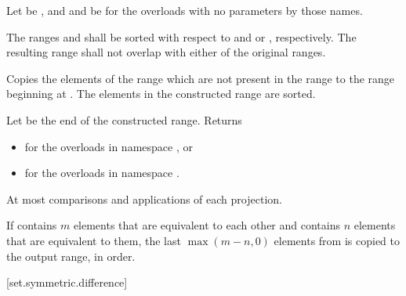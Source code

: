 \begin{itemdescr}
\pnum
Let  be ,
and  and  be 
for the overloads with no parameters by those names.

\pnum
\requires
The ranges  and  shall be sorted
with respect to  and  or , respectively.
The resulting range shall not overlap with either of the original ranges.

\pnum
\effects
Copies the elements of the range 
which are not present in the range 
to the range beginning at .
The elements in the constructed range are sorted.

\pnum
\returns
Let  be the end of the constructed range.
Returns
\begin{itemize}
\item
  for the overloads in namespace , or
\item
  for the overloads in namespace .
\end{itemize}

\pnum
\complexity
At most 
comparisons and applications of each projection.

\pnum
\remarks
If  contains $m$ elements
that are equivalent to each other and
 contains $n$ elements
that are equivalent to them,
the last $\max(m - n, 0)$ elements from 
is copied to the output range, in order.
\end{itemdescr}

[set.symmetric.difference]{}

